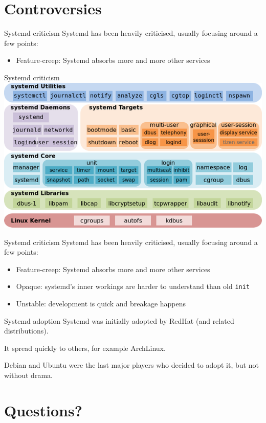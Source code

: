 \documentclass[12pt]{beamer}
\begin{document}
\section{Controversies}

\begin{frame}{Systemd criticism}
  Systemd has been heavily criticised, usually focusing around a few points:
  \begin{itemize}
  \item Feature-creep: Systemd absorbs more and more other services
  \end{itemize}
\end{frame}

\begin{frame}{Systemd criticism}
  \includegraphics[keepaspectratio=true,width=\textwidth]{systemdcomponents.png}
\end{frame}

\begin{frame}{Systemd criticism}
  Systemd has been heavily criticised, usually focusing around a few points:
  \begin{itemize}
  \item Feature-creep: Systemd absorbs more and more other services
  \item Opaque: systemd's inner workings are harder to understand than old \texttt{init}
  \item Unstable: development is quick and breakage happens
  \end{itemize}
\end{frame}

\begin{frame}{Systemd adoption}
  Systemd was initially adopted by RedHat (and related distributions).

  It spread quickly to others, for example ArchLinux.

  Debian and Ubuntu were the last major players who decided to adopt it, but not without drama.
\end{frame}

\section{Questions?}
\end{document}
